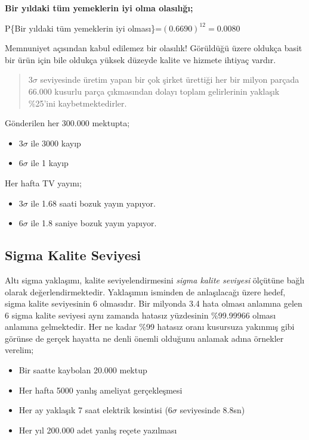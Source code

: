 \documentclass[
]{book}
\providecommand{\tightlist}{%
  \setlength{\itemsep}{0pt}\setlength{\parskip}{0pt}}
\begin{document}
\textbf{Bir yıldaki tüm yemeklerin iyi olma olasılığı;}

P\{Bir yıldaki tüm yemeklerin iyi olması\}=\((0.6690)^{12}=0.0080\)

Memnuniyet açısından kabul edilemez bir olasılık! Görüldüğü üzere oldukça basit bir ürün için bile oldukça yüksek düzeyde kalite ve hizmete ihtiyaç vardır.

\begin{quote}
3\(\sigma\) seviyesinde üretim yapan bir çok şirket ürettiği her bir milyon parçada 66.000 kusurlu parça çıkmasından dolayı toplam gelirlerinin yaklaşık \%25'ini kaybetmektedirler.
\end{quote}

Gönderilen her 300.000 mektupta;

\begin{itemize}
\tightlist
\item
  3\(\sigma\) ile 3000 kayıp
\item
  6\(\sigma\) ile 1 kayıp
\end{itemize}

Her hafta TV yayını;

\begin{itemize}
\tightlist
\item
  3\(\sigma\) ile 1.68 saati bozuk yayın yapıyor.
\item
  6\(\sigma\) ile 1.8 saniye bozuk yayın yapıyor.
\end{itemize}

\hypertarget{sigma-kalite-seviyesi}{%
\subsection{Sigma Kalite Seviyesi}\label{sigma-kalite-seviyesi}}

Altı sigma yaklaşımı, kalite seviyelendirmesini \emph{sigma kalite seviyesi} ölçütüne bağlı olarak değerlendirmektedir. Yaklaşımın isminden de anlaşılacağı üzere hedef, sigma kalite seviyesinin 6 olmasıdır. Bir milyonda 3.4 hata olması anlamına gelen 6 sigma kalite seviyesi aynı zamanda hatasız yüzdesinin \%99.99966 olması anlamına gelmektedir. Her ne kadar \%99 hatasız oranı kusursuza yakınmış gibi görünse de gerçek hayatta ne denli önemli olduğunu anlamak adına örnekler verelim;

\begin{itemize}
\tightlist
\item
  Bir saatte kaybolan 20.000 mektup
\item
  Her hafta 5000 yanlış ameliyat gerçekleşmesi
\item
  Her ay yaklaşık 7 saat elektrik kesintisi (6\(\sigma\) seviyesinde 8.8sn)
\item
  Her yıl 200.000 adet yanlış reçete yazılması
\end{itemize}
\end{document}
